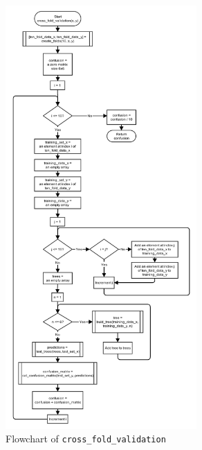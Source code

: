 \documentclass[10pt,a4paper]{article}
\begin{document}
\begin{figure}[!ht]
	\centering
	\includegraphics[width=0.65\textwidth]{images/flow_chart/cross_fold_validation.png}
	\caption{Flowchart of \tt{cross\_fold\_validation}}
	\label{fig:cross_fold_validation}
\end{figure}
\end{document}
